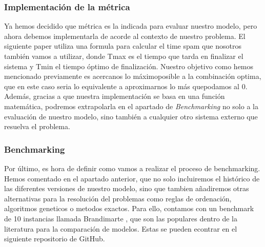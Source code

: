 \subsubsection{Implementación de la métrica}
Ya hemos decidido que métrica es la indicada para evaluar nuestro modelo, pero ahora debemos
implementarla de acorde al contexto de nuestro problema. El siguiente paper utiliza una formula para
calcular el time spam que nosotros también vamos a utilizar, donde Tmax es el tiempo que tarda en
finalizar el sistema y Tmin el tiempo óptimo de finalización. Nuestro objetivo como hemos mencionado
previamente es acercanos lo máximoposible a la combinación optima, que en este caso seria lo equivalente a
aproximarnos lo más quepodamos al 0. Además, gracias a que nuestra implementación se basa en una función
matemática, podremos extrapolarla en el apartado de \textit{Benchmarking} no solo a la evaluación de nuestro
modelo, sino también a cualquier otro sistema externo que resuelva el problema.


\subsubsection{Benchmarking}
Por último, es hora de definir como vamos a realizar el proceso de benchmarking. Hemos comentado en
el apartado anterior, que no solo incluiremos el histórico de las diferentes versiones de nuestro
modelo, sino que tambien añadiremos otras alternativas para la resolución del problemas como reglas de
ordenación, algoritmos geneticos o metodos exactos. Para ello, contamos con un benchmark de 10 instancias
llamada Brandimarte \cite*{pbrandimarte}, que son las populares dentro de la literatura para la comparación de modelos.
Estas se pueden econtrar en el siguiente repositorio \cite*{ptal} de GitHub.\medskip

